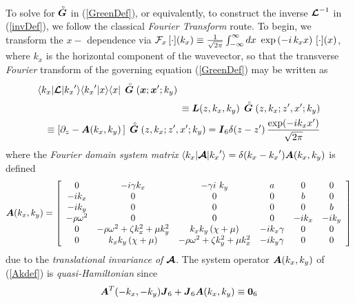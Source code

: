 \documentclass[11pt]{article}
\newcommand{\CB}[1]{\mbox{\boldmath$\cal #1$\unboldmath}}
\newcommand{\bmi}[1]{\mbox{\boldmath$\mit #1$\unboldmath}}
\newcommand{\rf}[1]{\stackrel{\scriptscriptstyle _{\,\,\circ}}{ #1}}
\begin{document}
To solve for $\rf{\bmi  G}$ in (\ref{GreenDef}), or equivalently, to construct
the
inverse  ${{\CB L}}^{-1}$ in (\ref{invDef}), we follow the
classical {\em Fourier Transform\/} route. To begin, we transform the $x-$
dependence via ${\cal F}_{x}\, [\cdot]({k}_{x})\equiv \frac{1}{\sqrt{2
\pi}}\int_{-\infty }^{ \infty
}dx\ \exp \left({-i\, {k}_{x} x}\right)\, [\cdot](x)$, where  ${k}_{x}$ is the
horizontal
component
of the wavevector,
so that the transverse {\em Fourier\/} transform of the governing equation
(\ref{GreenDef})
may be written as
\begin{eqnarray}	\label{FLdef}
\lefteqn{\langle { {k}_{x}} | {\CB L }| { {k}_{x}}^{\prime}\rangle
\langle { {k}_{x}}^{\prime}| x\rangle\langle x| \,\rf{\bmi
G}({\bmi x};{\bmi x}^{\prime};k_y)}\nonumber\\
&&\equiv{\bmi  L}(z,{k}_{x},{k}_{y}) \,\rf{\bmi  G}(z,{k}_{x};z^{\prime},x^{\prime};k_y)\nonumber\\
&& \equiv \left[\partial_z -{\bmi  A}({k}_{x},{k}_{y})\,  \right]\,\rf{\bmi
G}(z,{k}_{x};z^{\prime},x^{\prime};k_y)={\bmi  I}_{6}
	\delta(z-z^{\prime}) \, \frac{\exp(-i {k}_{x} x^{\prime})}{\sqrt{2 \pi}}
\end{eqnarray}
where the {\em Fourier domain system matrix\/} $\langle { {k}_{x}} | {\CB A }|
{ {k}_{x}}^{\prime}\rangle= \delta({ {k}_{x}}-{ {k}_{x}}^{\prime}) {\bmi
A}({k}_{x},{k}_{y})$ is defined
\begin{equation}	\label{Akdef}
	{\bmi  A}({k}_{x},{k}_{y})=\left[{\begin{array}{cccccc}
0&-i \gamma {  k}_{  x}&
 - \gamma   i\ {k}_{y}&a&0&0\\ -i{k}_{x}&0&0&0&b&0\\
-i{k}_{y}&0&0&0&0&b\\ - \rho {\omega }^{  2}&
0&0&0&-i{k}_{x}&-i{k}_{y}\\
0&- \rho {\omega }^{  2}  +
\zeta {  k}_{  x}^{  2}  + \mu {
k}_{  y}^{  2}&{  k}_{  x}{  k}_{
 y}\left({\chi   + \mu }\right)&  -i{k}_{x} \gamma
&  0&0\\ 0&{k}_{x}{k}_{y}\left({ \chi   + \mu
}\right)&- \rho {\omega }^{  2}  + \zeta {
k}_{  y}^{  2}  + \mu {  k}_{
x}^{  2}&  -i{k}_{y} \gamma &  0&0\end{array}}\right]
\end{equation}
due to the {\em translational invariance of\/} ${\CB A }$.
The system operator ${\bmi  A}({k}_{x},{k}_{y})$ of
(\ref{Akdef}) is {\em quasi-Hamiltonian\/} since
\begin{equation} \label{ATdef}
{\bmi  A}^{T}(-{k}_{x},-{k}_{y}){\bmi  J}_6 + {\bmi  J}_6 {\bmi
A}({k}_{x},{k}_{y}) \equiv {\bf 0}_6
\end{equation}
\end{document}
